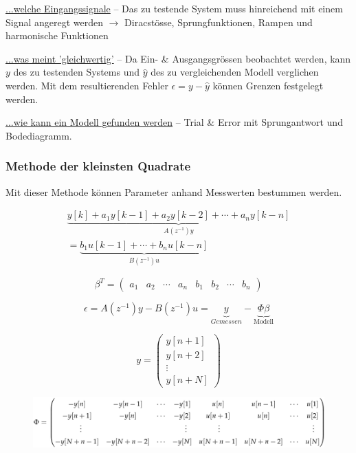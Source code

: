 \documentclass[
  10pt,
  a4paper,
  twocolumn]{article}
\numberwithin{equation}{section}
\begin{document}
\underline{\footnotesize{...welche Eingangssignale}} -- Das zu testende
System muss hinreichend mit einem Signal angeregt werden \(\rightarrow\)
Diracstösse, Sprungfunktionen, Rampen und harmonische Funktionen

\underline{\footnotesize{...was meint 'gleichwertig'}} -- Da Ein- \&
Ausgangsgrössen beobachtet werden, kann \(y\) des zu testenden Systems
und \(\hat{y}\) des zu vergleichenden Modell verglichen werden. Mit dem
resultierenden Fehler \(\epsilon = y - \hat{y}\) können Grenzen
festgelegt werden.

\underline{\footnotesize{...wie kann ein Modell gefunden werden}} --
Trial \& Error mit Sprungantwort und Bodediagramm.

\hypertarget{methode-der-kleinsten-quadrate}{%
\subsubsection{Methode der kleinsten
Quadrate}\label{methode-der-kleinsten-quadrate}}

Mit dieser Methode können Parameter anhand Messwerten bestummen werden.

\[
\begin{array}{r}
\underbrace{y[k]+a_1y[k-1]+a_2y[k-2]+\cdots+a_ny[k-n]}_{A(z^{-1})y}\\
= \underbrace{b_1u[k-1]+\cdots+b_nu[k-n]}_{B(z^{-1})u}
\end{array}
\]

\[
\beta^T=\begin{pmatrix}
a_1 & a_2 & \cdots & a_n & b_1 & b_2 & \cdots & b_n
\end{pmatrix}
\]

\[
\epsilon = A(z^{-1})y-B(z^{-1})u = \underbrace{y}_{Gemessen}-\underbrace{\Phi\beta}_{\text{Modell}}
\]

\[
y = \begin{pmatrix}
  y[n+1]\\
  y[n+2]\\
  \vdots\\
  y[n+N]
\end{pmatrix}
\]

\begin{figure}[H]

{\centering \includegraphics{images/paste-36.png}

}

\end{figure}
\end{document}
